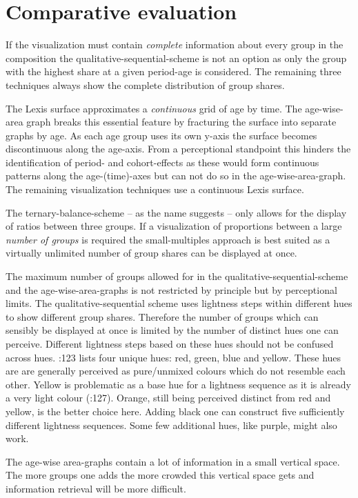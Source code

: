 \documentclass[a4paper]{scrartcl}
\begin{document}
\section*{Comparative evaluation}

If the visualization must contain \emph{complete} information about every group in the composition the qualitative-sequential-scheme is not an option as only the group with the highest share at a given period-age is considered. The remaining three techniques always show the complete distribution of group shares.

The Lexis surface approximates a \emph{continuous} grid of age by time. The age-wise-area graph breaks this essential feature by fracturing the surface into separate graphs by age. As each age group uses its own y-axis the surface becomes discontinuous along the age-axis. From a perceptional standpoint this hinders the identification of period- and cohort-effects as these would form continuous patterns along the age-(time)-axes but can not do so in the age-wise-area-graph. The remaining visualization techniques use a continuous Lexis surface.

The ternary-balance-scheme -- as the name suggests -- only allows for the display of ratios between three groups. If a visualization of proportions between a large \emph{number of groups} is required the small-multiples approach is best suited as a virtually unlimited number of group shares can be displayed at once.

The maximum number of groups allowed for in the qualitative-sequential-scheme and the age-wise-area-graphs is not restricted by principle but by perceptional limits. The qualitative-sequential scheme uses lightness steps within different hues to show different group shares. Therefore the number of groups which can sensibly be displayed at once is limited by the number of distinct hues one can perceive. Different lightness steps based on these hues should not be confused across hues. \textcite{Ware2013}:123 lists four unique hues: red, green, blue and yellow. These hues are are generally perceived as pure/unmixed colours which do not resemble each other. Yellow is problematic as a base hue for a lightness sequence as it is already a very light colour (\cite{Ware2013}:127). Orange, still being perceived distinct from red and yellow, is the better choice here. Adding black one can construct five sufficiently different lightness sequences. Some few additional hues, like purple, might also work.

The age-wise area-graphs contain a lot of information in a small vertical space. The more groups one adds the more crowded this vertical space gets and information retrieval will be more difficult.
\end{document}
